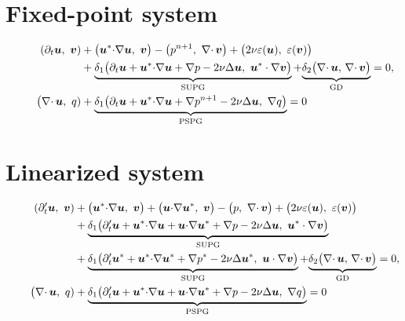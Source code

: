 \documentclass[onefignum,onetabnum]{siamart190516}
\begin{document}
\section{Fixed-point system}

\begin{equation}
  \begin{aligned}
    \left( \partial_t \bu ,\  \bv \right) 
    &+ \big( {\color{black}\bu^*} \SCAL \GRAD \bu,\ \bv \big)
    - \big( {\color{black}p^{n+1}},\ \DIV \bv \big) + 
    \big( 2 \nu \varepsilon(\bu),\ \varepsilon(\bv) \big) \\
    & 
    +  
    \underbrace{\delta_1 \big( \partial_t \bu + {\color{black}\bu^*} \SCAL \GRAD \bu + \GRAD p - 2 \nu \Delta \bu,\ {\color{black}\bu^*} \cdot \GRAD \bv \big)}_{\text{SUPG}}  +
    {\underbrace{\delta_2 \big(\DIV \bu, \, \DIV \bv \big)}_{\text{GD}}}
    =0, \\
    \hspace{2.2em} 
    \big( \DIV \bu,\ q)&
    + \underbrace{\delta_1 \big( \partial_t \bu + {\color{black}\bu^*} \SCAL \GRAD \bu + {\color{black}\GRAD p^{n+1}} - 2 \nu \Delta \bu,\ \GRAD q \big)}_{\text{PSPG}} = 0 
  \end{aligned}
\end{equation}

\section{Linearized system}

\begin{equation}
  \begin{aligned}
    \left( {\color{black}\partial_t'} {\boldsymbol u} ,\  {\boldsymbol v} \right) 
    &+ \big( {\boldsymbol u}^* {\cdot} \nabla {\boldsymbol u},\ {\boldsymbol v} \big)
    + {\color{black}\big( {\boldsymbol u} {\cdot} \nabla {\boldsymbol u}^*,\ {\boldsymbol v} \big)}
    - \big( p,\ \nabla{\cdot\,} {\boldsymbol v} \big) + 
    \big( 2 \nu \varepsilon({\boldsymbol u}),\ \varepsilon({\boldsymbol v}) \big) \\
    & 
    +  
    \underbrace{\delta_1 \big( {\color{black}\partial_t'} {\boldsymbol u} + {\color{black}{\boldsymbol u}^*} {\cdot} \nabla {\boldsymbol u} +  {\color{black}{\boldsymbol u} {\cdot} \nabla {\boldsymbol u}^*} + \nabla p - 2 \nu \Delta {\boldsymbol u},\ {\color{black}{\boldsymbol u}^*} \cdot \nabla {\boldsymbol v} \big)}_{\text{SUPG}} 
    \\
    & 
    +  
    \underbrace{{\color{black}\delta_1 \big(\partial_t' {\boldsymbol u}^* + {\boldsymbol u}^* {\cdot} \nabla {\boldsymbol u}^* + \nabla p^* - 2 \nu \Delta {\boldsymbol u}^*,\ {\boldsymbol u} \cdot \nabla {\boldsymbol v} \big)}}_{\text{SUPG}}  +
    {\underbrace{\delta_2 \big(\nabla{\cdot\,} {\boldsymbol u}, \, \nabla{\cdot\,} {\boldsymbol v} \big)}_{\text{GD}}}
    =0, \\
    \hspace{2.2em} 
    \big( \nabla{\cdot\,} {\boldsymbol u},\ q)&
    + \underbrace{\delta_1 \big( {\color{black}\partial_t'} {\boldsymbol u} + {\color{black}{\boldsymbol u}^*} {\cdot} \nabla {\boldsymbol u} + {\color{black}{\boldsymbol u} {\cdot} \nabla {\boldsymbol u}^*} + \nabla p - 2 \nu \Delta {\boldsymbol u},\ \nabla q \big)}_{\text{PSPG}} = 0 
  \end{aligned}
\end{equation}
\end{document}
